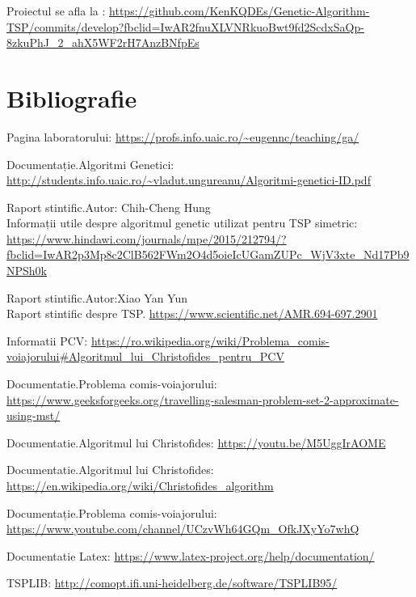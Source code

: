 \documentclass[11pt,leqno]{article}
\begin{document}
\par Proiectul se afla la : \url{https://github.com/KenKQDEs/Genetic-Algorithm-TSP/commits/develop?fbclid=IwAR2fnuXLVNRkuoBwt9fd2ScdxSaQp-8zkuPhJ_2_ahX5WF2rH7AnzBNfpEs}

\begin{flushleft}

\end{flushleft}
\section{Bibliografie}
\begin{thebibliography}{9}

Pagina laboratorului:
\url{https://profs.info.uaic.ro/~eugennc/teaching/ga/}




  Documentație.Algoritmi Genetici:
\url{http://students.info.uaic.ro/~vladut.ungureanu/Algoritmi-genetici-ID.pdf}


 Raport stintific.Autor: Chih-Cheng Hung\\ Informații utile despre  algoritmul genetic utilizat  pentru TSP
 simetric:
  \url{https://www.hindawi.com/journals/mpe/2015/212794/?fbclid=IwAR2p3Mp8c2ClB562FWm2O4d5oieIcUGamZUPc_WjV3xte_Nd17Pb9NPSh0k}

 Raport stintific.Autor:Xiao Yan Yun\\ Raport stintific despre TSP.
  \url{https://www.scientific.net/AMR.694-697.2901}

  Informatii PCV:
  \url{https://ro.wikipedia.org/wiki/Problema_comis-voiajorului#Algoritmul_lui_Christofides_pentru_PCV}

Documentatie.Problema comis-voiajorului:
\url{https://www.geeksforgeeks.org/travelling-salesman-problem-set-2-approximate-using-mst/}

Documentatie.Algoritmul lui Christofides:
\url{https://youtu.be/M5UggIrAOME}

Documentatie.Algoritmul lui Christofides:
\url{https://en.wikipedia.org/wiki/Christofides_algorithm}

  Documentație.Problema comis-voiajorului:
\url{https://www.youtube.com/channel/UCzvWh64GQm_OfkJXyYo7whQ}

  Documentatie Latex:
  \url{https://www.latex-project.org/help/documentation/}

TSPLIB:
\url{http://comopt.ifi.uni-heidelberg.de/software/TSPLIB95/}



\end{thebibliography}  
\end{document}
